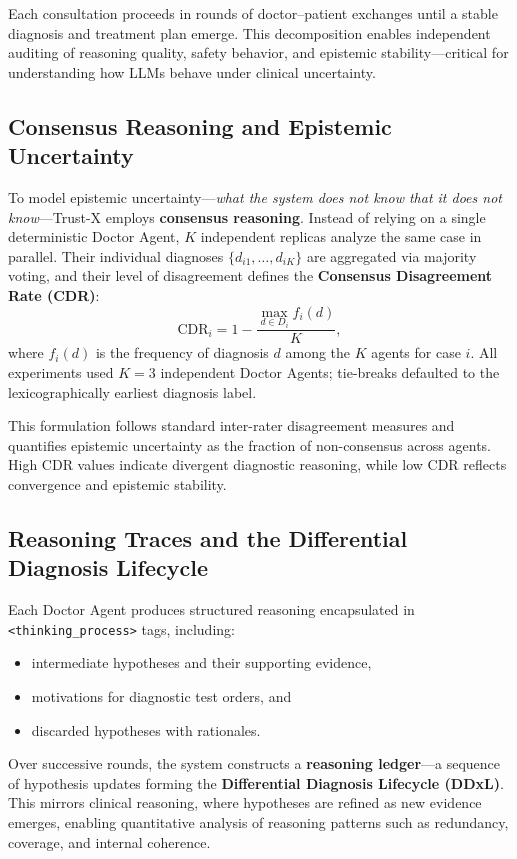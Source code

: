 \documentclass[letterpaper]{article} %
\begin{document}
Each consultation proceeds in rounds of doctor–patient exchanges until a stable diagnosis and treatment plan emerge. This decomposition enables independent auditing of reasoning quality, safety behavior, and epistemic stability—critical for understanding how LLMs behave under clinical uncertainty.

\subsection{Consensus Reasoning and Epistemic Uncertainty}

To model epistemic uncertainty—\textit{what the system does not know that it does not know}—Trust-X employs \textbf{consensus reasoning}. 
Instead of relying on a single deterministic Doctor Agent, $K$ independent replicas analyze the same case in parallel. 
Their individual diagnoses $\{d_{i1}, \dots, d_{iK}\}$ are aggregated via majority voting, and their level of disagreement defines the \textbf{Consensus Disagreement Rate (CDR)}:
\[
\mathrm{CDR}_i = 1 - \frac{\max_{d \in D_i} f_i(d)}{K},
\]
where $f_i(d)$ is the frequency of diagnosis $d$ among the $K$ agents for case $i$. All experiments used $K=3$ independent Doctor Agents; tie-breaks defaulted to the lexicographically earliest diagnosis label.

This formulation follows standard inter-rater disagreement measures and quantifies epistemic uncertainty as the fraction of non-consensus across agents.  
High CDR values indicate divergent diagnostic reasoning, while low CDR reflects convergence and epistemic stability.  

\subsection{Reasoning Traces and the Differential Diagnosis Lifecycle}

Each Doctor Agent produces structured reasoning encapsulated in \texttt{<thinking\_process>} tags, including:
\begin{itemize}
    \item intermediate hypotheses and their supporting evidence,
    \item motivations for diagnostic test orders, and
    \item discarded hypotheses with rationales.
\end{itemize}

Over successive rounds, the system constructs a \textbf{reasoning ledger}—a sequence of hypothesis updates forming the \textbf{Differential Diagnosis Lifecycle (DDxL)}. 
This mirrors clinical reasoning, where hypotheses are refined as new evidence emerges, enabling quantitative analysis of reasoning patterns such as redundancy, coverage, and internal coherence.
\end{document}
